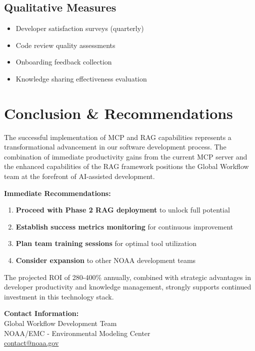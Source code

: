 \documentclass[11pt,letterpaper]{article}
\begin{document}
\subsection{Qualitative Measures}
\begin{itemize}
    \item Developer satisfaction surveys (quarterly)
    \item Code review quality assessments
    \item Onboarding feedback collection
    \item Knowledge sharing effectiveness evaluation
\end{itemize}

\section{Conclusion \& Recommendations}

\begin{executivebox}
The successful implementation of MCP and RAG capabilities represents a transformational advancement in our software development process. The combination of immediate productivity gains from the current MCP server and the enhanced capabilities of the RAG framework positions the Global Workflow team at the forefront of AI-assisted development.

\textbf{Immediate Recommendations:}
\begin{enumerate}
    \item \textbf{Proceed with Phase 2 RAG deployment} to unlock full potential
    \item \textbf{Establish success metrics monitoring} for continuous improvement
    \item \textbf{Plan team training sessions} for optimal tool utilization
    \item \textbf{Consider expansion} to other NOAA development teams
\end{enumerate}

The projected ROI of 280-400\% annually, combined with strategic advantages in developer productivity and knowledge management, strongly supports continued investment in this technology stack.
\end{executivebox}

\vspace{1cm}
\begin{center}

\vspace{0.5cm}
\color{noaaNavy}
\textbf{Contact Information:} \\
Global Workflow Development Team \\
NOAA/EMC - Environmental Modeling Center \\
\href{mailto:contact@noaa.gov}{contact@noaa.gov}
\end{center}
\end{document}
